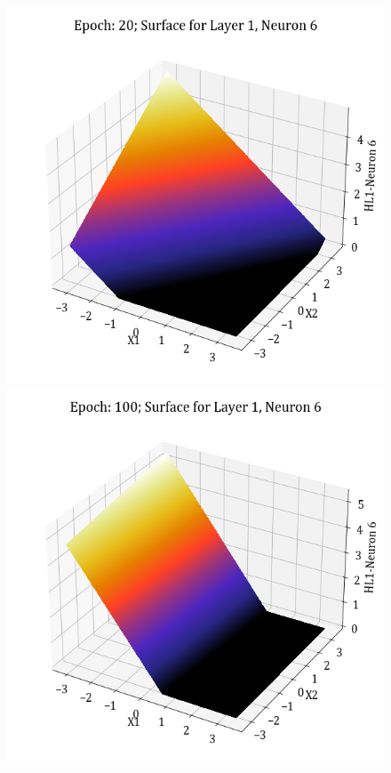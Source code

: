 \documentclass[11pt,a4paper]{article}
\begin{document}
\begin{figure}[H]
    \includegraphics[scale=0.4]{images/1B_MLFFNN_E20_HL1_N6.png}
    \includegraphics[scale=0.4]{images/1B_MLFFNN_E100_HL1_N6.png}

\end{figure}
\end{document}
